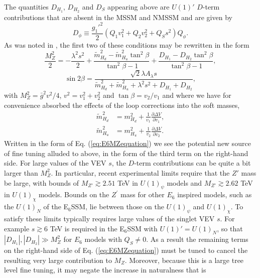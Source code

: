 \documentclass[preprint,amsmath,amssymb,aps,superscriptaddress,prd,showpacs,floatfix,nofootinbib]{revtex4-1}
\begin{document}
The quantities $D_{H_1}$, $D_{H_2}$ and $D_S$ appearing above are
$U(1)'$ $D$-term contributions that are absent in the MSSM and NMSSM
and are given by
\begin{equation}\label{eq:E6Dterms}
D_\phi\equiv \frac{g_1'^2}{2}\left (
Q_1v_1^2+Q_2v_2^2+Q_Ss^2\right
)Q_\phi.
\end{equation}
As was noted in \cite{Athron:2013ipa}, the first two of these
conditions may be rewritten in the form
\begin{equation}\label{eq:E6MZequation}
\frac{M_Z^2}{2}=-\frac{\lambda^2s^2}{2}+\frac{\tilde{m}_{H_d}^2-\tilde{m}_{H_u}^2\tan^2\beta}{\tan^2\beta-1}+\frac{D_{H_1}-D_{H_2}\tan^2\beta}{\tan^2\beta-1},
\end{equation}
\begin{equation}\label{eq:E6sin2bequation}
\sin 2\beta=\frac{\sqrt{2}\lambda A_{\lambda} s}{\tilde{m}_{H_d}^2+\tilde{m}_{H_u}^2+\lambda^2s^2+D_{H_1}+D_{H_2}},
\end{equation}
with $M_Z^2=\bar{g}^2v^2/4$, $v^2=v_1^2+v_2^2$ and $\tan\beta =
v_2/v_1$ and where we have for convenience absorbed the effects of the
loop corrections into the soft masses,
\begin{align*}
\tilde{m}_{H_d}^2&=m_{H_d}^2+\frac{1}{v_1}\frac{\partial \Delta
  V}{\partial
  v_1},\\ \tilde{m}_{H_u}^2&=m_{H_u}^2+\frac{1}{v_2}\frac{\partial
  \Delta V}{\partial v_2}.
\end{align*}
Written in the form of Eq. (\ref{eq:E6MZequation}) we see the
potential new source of fine tuning alluded to above, in the form of
the third term on the right-hand side. For large values of the VEV
$s$, the $D$-term contributions can be quite a bit larger than
$M_Z^2$. In particular, recent experimental limits \cite{Aad:2014cka}
require that the $Z'$ mass be large, with bounds of $M_{Z'}\gtrsim
2.51$ TeV in $U(1)_\psi$ models and $M_{Z'}\gtrsim 2.62$ TeV in
$U(1)_\chi$ models. Bounds on the $Z^\prime$ mass for other $E_6$ inspired models, such as the $U(1)_N$ of the E$_6$SSM, lie between those on the $U(1)_\psi$ and $U(1)_\chi$. To satisfy these limits typically requires large
values of the singlet VEV $s$. For example $s\gtrsim 6$ TeV is
required in the E$_6$SSM with $U(1)'=U(1)_N$, so that
$|D_{H_1}|,|D_{H_2}|\gg M_Z^2$ for $E_6$ models with $Q_S\neq
0$. As a result the remaining terms on the right-hand side of
Eq. (\ref{eq:E6MZequation}) must be tuned to cancel the resulting very
large contribution to $M_Z$. Moreover, because this is a large tree
level fine tuning, it may negate the increase in naturalness that is
\end{document}
